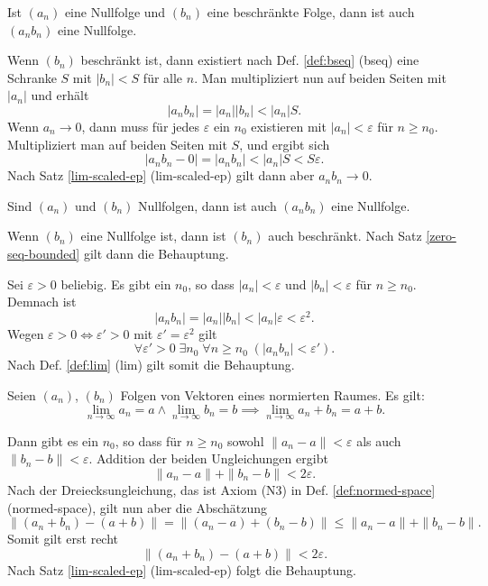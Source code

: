 \begin{Satz}\label{zero-seq-bounded}
Ist $(a_n)$ eine Nullfolge und $(b_n)$ eine beschränkte Folge,
dann ist auch $(a_n b_n)$ eine Nullfolge.
\end{Satz}

\begin{Beweis}
Wenn $(b_n)$ beschränkt ist, dann existiert nach
Def. \ref{def:bseq} (bseq) eine Schranke $S$ mit
$|b_n|<S$ für alle $n$. Man multipliziert nun auf beiden Seiten
mit $|a_n|$ und erhält
\[|a_n b_n| = |a_n| |b_n| < |a_n| S.\]
Wenn $a_n\to 0$, dann muss für jedes $\varepsilon$
ein $n_0$ existieren mit $|a_n|<\varepsilon$ für $n\ge n_0$.
Multipliziert man auf beiden Seiten mit $S$, und ergibt sich
\[|a_n b_n-0| = |a_n b_n| < |a_n| S < S\varepsilon.\]
Nach Satz \ref{lim-scaled-ep} (lim-scaled-ep) gilt dann
aber $a_n b_n\to 0$.\,\qedsymbol
\end{Beweis}

\begin{Satz}
Sind $(a_n)$ und $(b_n)$ Nullfolgen,
dann ist auch $(a_n b_n)$ eine Nullfolge.
\end{Satz}

\begin{Beweis}[Beweis 1]
Wenn $(b_n)$ eine Nullfolge ist, dann ist $(b_n)$ auch beschränkt.
Nach Satz \ref{zero-seq-bounded} gilt dann die Behauptung.
\end{Beweis}

\begin{Beweis}[Beweis 2]
Sei $\varepsilon>0$ beliebig.
Es gibt ein $n_0$, so dass
$|a_n|<\varepsilon$ und $|b_n|<\varepsilon$ für $n\ge n_0$.
Demnach ist
\[|a_n b_n| = |a_n| |b_n|< |a_n|\varepsilon <\varepsilon^2.\]
Wegen $\varepsilon>0\iff\varepsilon'>0$ mit
$\varepsilon'=\varepsilon^2$ gilt
\[\forall\varepsilon'{>}0\;\exists n_0\;\forall n{\ge}n_0\;
(|a_n b_n|<\varepsilon').\]
Nach Def. \ref{def:lim} (lim) gilt somit die Behauptung.\,\qedsymbol
\end{Beweis}

\begin{Satz}%
\label{lim-add}
Seien $(a_n)$, $(b_n)$ Folgen von Vektoren eines normierten Raumes.
Es gilt:
\[\lim_{n\to\infty} a_n = a\land \lim_{n\to\infty} b_n
= b \implies \lim_{n\to\infty} a_n+b_n = a+b.\]
\end{Satz}

\begin{Beweis}
Dann gibt es ein $n_0$, so dass für $n\ge n_0$ sowohl
$\|a_n-a\|<\varepsilon$ als auch $\|b_n-b\|<\varepsilon$.
Addition der beiden Ungleichungen ergibt
\[\|a_n-a\| + \|b_n-b\| < 2\varepsilon.\]
Nach der Dreiecksungleichung, das ist Axiom (N3) in Def.
\ref{def:normed-space} (normed-space), gilt nun aber die Abschätzung
\[\|(a_n+b_n)-(a+b)\| = \|(a_n-a)+(b_n-b)\| \le \|a_n-a\|+\|b_n-b\|.\]
Somit gilt erst recht
\[\|(a_n+b_n)-(a+b)\| < 2\varepsilon.\]
Nach Satz \ref{lim-scaled-ep} (lim-scaled-ep)
folgt die Behauptung.\,\qedsymbol
\end{Beweis}

